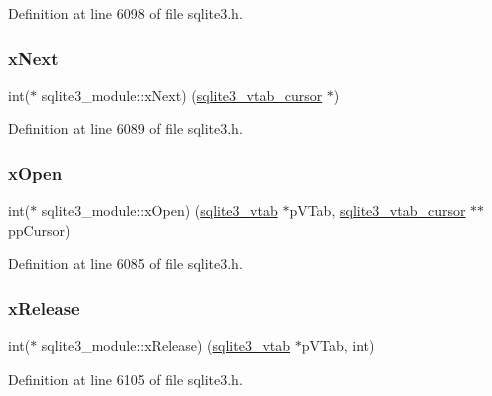 Definition at line 6098 of file sqlite3.\+h.

\mbox{\label{structsqlite3__module_a7a95af281219212e50f3417f8c816bfc}} 
\subsubsection{\texorpdfstring{x\+Next}{xNext}}
{\footnotesize\ttfamily int($\ast$ sqlite3\+\_\+module\+::x\+Next) (\mbox{\hyperlink{structsqlite3__vtab__cursor}{sqlite3\+\_\+vtab\+\_\+cursor}} $\ast$)}



Definition at line 6089 of file sqlite3.\+h.

\mbox{\label{structsqlite3__module_a3f1e18ef5e5bd4ddbd9500c7cd951f34}} 
\subsubsection{\texorpdfstring{x\+Open}{xOpen}}
{\footnotesize\ttfamily int($\ast$ sqlite3\+\_\+module\+::x\+Open) (\mbox{\hyperlink{structsqlite3__vtab}{sqlite3\+\_\+vtab}} $\ast$p\+V\+Tab, \mbox{\hyperlink{structsqlite3__vtab__cursor}{sqlite3\+\_\+vtab\+\_\+cursor}} $\ast$$\ast$pp\+Cursor)}



Definition at line 6085 of file sqlite3.\+h.

\mbox{\label{structsqlite3__module_ac5f0d86a3e9a26668dbf1251a7c51517}} 
\subsubsection{\texorpdfstring{x\+Release}{xRelease}}
{\footnotesize\ttfamily int($\ast$ sqlite3\+\_\+module\+::x\+Release) (\mbox{\hyperlink{structsqlite3__vtab}{sqlite3\+\_\+vtab}} $\ast$p\+V\+Tab, int)}



Definition at line 6105 of file sqlite3.\+h.

